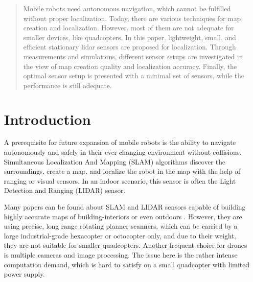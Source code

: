 \documentclass[conference]{IEEEtran}
\begin{document}
\begin{abstract}
Mobile robots need autonomous navigation, which cannot be fulfilled without proper localization. Today, there are various techniques for map creation and localization. However, most of them are not adequate for smaller devices, like quadcopters. In this paper, lightweight, small, and efficient stationary lidar sensors are proposed for localization. Through measurements and simulations, different sensor setups are investigated in the view of map creation quality and localization accuracy. Finally, the optimal sensor setup is presented with a minimal set of sensors, while the performance is still adequate.
\end{abstract}



%
\IEEEpeerreviewmaketitle



\section{Introduction}
A prerequisite for future expansion of mobile robots is the ability to navigate autonomously and safely in 
their ever-changing environment without collisions. Simultaneous Localization And Mapping (SLAM) algorithms
discover the surroundings, create a map, and localize the robot in the map with the help of ranging or visual 
sensors. In an indoor scenario, this sensor is often the Light Detection and Ranging (LIDAR) sensor. 

Many papers can be found about SLAM and LIDAR sensors capable of building highly accurate maps of building-interiors or even outdoors \cite{engel2014lsd} \cite{mur2015orb} \cite{engel2015large}. However, they are using precise, long range rotating planner scanners,
which can be carried by a large industrial-grade hexacopter or octocopter only, and due to their weight, they are
not suitable for smaller quadcopters. Another frequent choice for drones is multiple cameras and image processing.
The issue here is the rather intense computation demand, which is hard to satisfy on a small quadcopter with 
limited power supply. 
\end{document}
